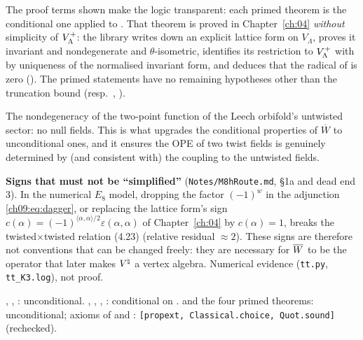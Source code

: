 \begin{dictionary}
The proof terms shown make the logic transparent: each primed theorem is the conditional one
applied to . That theorem is proved in Chapter~\ref{ch:04} \emph{without}
simplicity of $V_{\Lambda}^{+}$: the library writes down an explicit lattice form on $V_\Lambda$, proves it
invariant and nondegenerate and $\theta$-isometric, identifies its restriction to $V_{\Lambda}^{+}$ with
 by uniqueness of the normalised invariant form, and deduces that the radical of
 is zero (). The primed statements have no remaining
hypotheses other than the truncation bound  (resp.\ , ).
\end{dictionary}

\begin{physics}
The nondegeneracy of the two-point function of the Leech orbifold's untwisted sector: no null fields. This is what upgrades the conditional properties of $\overline W$ to unconditional ones, and it ensures the OPE of two twist fields is genuinely determined by (and consistent with) the coupling to the untwisted fields.
\end{physics}

\begin{warning}
\textbf{Signs that must not be ``simplified''} (\texttt{Notes/M8hRoute.md}, \S1a and dead end 3).
In the numerical $E_8$ model, dropping the factor $(-1)^w$ in the adjunction \eqref{ch09:eq:dagger},
or replacing the lattice form's sign $c(\alpha)=(-1)^{\langle\alpha,\alpha\rangle/2}\varepsilon(\alpha,\alpha)$
of Chapter~\ref{ch:04} by $c(\alpha)=1$, breaks the twisted$\times$twisted relation (4.23) (relative
residual $\approx2$). These signs are therefore not conventions that can be changed freely: they
are necessary for $\overline{W}$ to be the operator that later makes ${V^{\natural}}$ a vertex algebra.
Numerical evidence (\texttt{tt.py}, \texttt{tt\_K3.log}), not proof.
\end{warning}

\begin{status}
, , : unconditional.
, , , :
conditional on .  and the four primed theorems: unconditional;
axioms of  and : \texttt{[propext,
Classical.choice, Quot.sound]} (rechecked).
\end{status}

